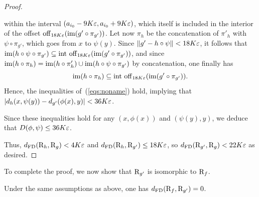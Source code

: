 \begin{proof}
\begin{itemize}
\begin{itemize}
within the interval $(a_{i_0}-9K\varepsilon,a_{i_0}+9K\varepsilon)$, which itself is
included in the interior of the offset ${\rm off}_{18K\varepsilon}({\rm im}(g'\circ\pi_{g'}))$. Let now
$\pi_h$ be the concatenation of $\pi'_h$ with $\psi\circ\pi_{g'}$, which goes from $x$ to
$\psi(y)$.
Since $\|g'-h\circ\psi\|<18K\varepsilon$, it follows that 
${\rm im}(h\circ\psi\circ\pi_{g'})\subseteq {\rm int}\ {\rm off}_{18K\varepsilon}({\rm im}(g'\circ\pi_{g'}))$, and since 
${\rm im}(h\circ\pi_h)={\rm im}(h\circ\pi'_h)\cup{\rm im}(h\circ\psi\circ\pi_{g'})$ by
concatenation, one finally has $${\rm im}(h\circ\pi_h)\subseteq {\rm
  int}\ {\rm off}_{18K\varepsilon}({\rm im}(g'\circ\pi_{g'})).$$ Hence, the 
inequalities of~(\ref{eqs:noname}) hold, implying that $|d_h(x,\psi(y))-d_{g'}(\phi(x),y)| < 36K\varepsilon$.
\end{itemize} 
Since these inequalities hold for any $(x,\phi(x))$ and $(\psi(y),y)$, we deduce that $D(\phi,\psi) \leq 36K\varepsilon$.
\end{itemize}
Thus,
$d_{\rm FD}(\mathrm{R}_{h},\mathrm{R}_g)<4K\varepsilon$  and $d_{\rm FD}(\mathrm{R}_h,\mathrm{R}_{g'})\leq 18K\varepsilon$, so
$d_{\rm FD}(\mathrm{R}_{g'},\mathrm{R}_g) < 22K\varepsilon$ as desired.
\end{proof}

To complete the proof, we now show that $\mathrm{R}_{g'}$ is isomorphic to $\mathrm{R}_f$. %

\begin{prop}\label{prop:iso2}
Under the same assumptions as above,  
one has $d_{\rm FD}(\mathrm{R}_f,\mathrm{R}_{g'})=0$.
\end{prop}

